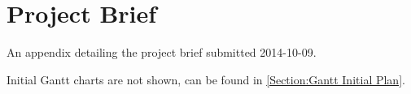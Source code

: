 \chapter{Project Brief} \label{App:Project Brief}

\begin{preamble}
	An appendix detailing the project brief submitted 2014-10-09.
\end{preamble}

\begin{center}
	\vspace{-10pt}
\end{center}

Initial Gantt charts are not shown, can be found in \autoref{Section:Gantt Initial Plan}.

